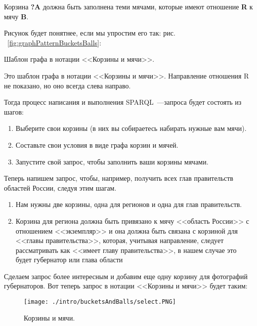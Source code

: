 Корзина \textbf{?A} должна быть заполнена теми мячами, которые имеют отношение \textbf{R} к мячу \textbf{B}.

Рисунок будет понятнее, если мы упростим его так: рис. ~\ref{fig:graphPatternBucketsBalls}: 

\begin{marginfigure}[1.0cm]
	{
		\setlength{\fboxsep}{0pt}%
		\setlength{\fboxrule}{1pt}%
	}
    \caption{Шаблон графа в нотации <<Корзины и мячи>>.}
	\label{fig:graphPatternBucketsBalls}
\end{marginfigure}

Это шаблон графа в нотации <<Корзины и мячи>>. Направление отношения R не показано, но оно всегда слева направо.

Тогда процесс написания и выполнения SPARQL~---запроса будет состоять из шагов:
\begin{enumerate}
    \item Выберите свои корзины (в них вы собираетесь набирать нужные вам мячи).
    \item Составьте свои условия в виде графа корзин и мячей.
    \item Запустите свой запрос, чтобы заполнить ваши корзины мячами.
\end{enumerate}

Теперь напишем запрос, чтобы, например, получить всех глав правительств областей России, следуя этим шагам.

\begin{enumerate}
    \item Нам нужны две корзины, одна для регионов и одна для глав правительств.
    \item Корзина для региона должна быть привязано к мячу <<область России>> с отношением <<экземпляр>> и она должна быть связана с корзиной для <<главы правительства>>, которая, учитывая направление, следует рассматривать как <<имеет главу правительства>>, в нашем случае это будет губернатор или глава области
\end{enumerate}

Сделаем запрос более интересным и добавим еще одну корзину для фотографий губернаторов. Вот теперь запрос в нотации <<Корзины и мячи>> будет таким:

\begin{figure*}[h!]
    \texttt{[image: ./intro/bucketsAndBalls/select.PNG]}
    \caption{Корзины и мячи.}
	\label{fig:BucketsBalls}
\end{figure*}

